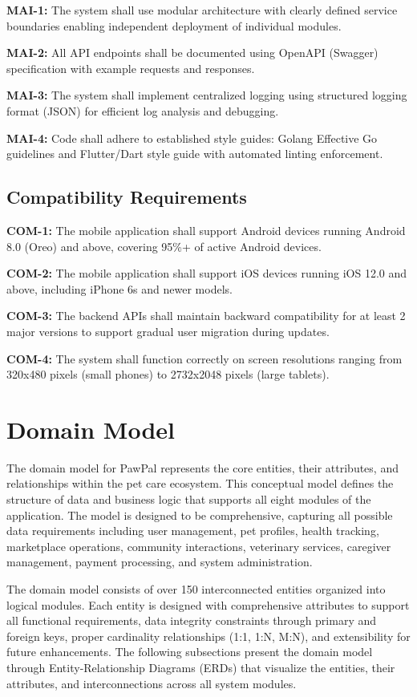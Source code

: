 \textbf{MAI-1:} The system shall use modular architecture with clearly defined service boundaries enabling independent deployment of individual modules.

\textbf{MAI-2:} All API endpoints shall be documented using OpenAPI (Swagger) specification with example requests and responses.

\textbf{MAI-3:} The system shall implement centralized logging using structured logging format (JSON) for efficient log analysis and debugging.

\textbf{MAI-4:} Code shall adhere to established style guides: Golang Effective Go guidelines and Flutter/Dart style guide with automated linting enforcement.

\subsection{Compatibility Requirements}

\textbf{COM-1:} The mobile application shall support Android devices running Android 8.0 (Oreo) and above, covering 95\%+ of active Android devices.

\textbf{COM-2:} The mobile application shall support iOS devices running iOS 12.0 and above, including iPhone 6s and newer models.

\textbf{COM-3:} The backend APIs shall maintain backward compatibility for at least 2 major versions to support gradual user migration during updates.

\textbf{COM-4:} The system shall function correctly on screen resolutions ranging from 320x480 pixels (small phones) to 2732x2048 pixels (large tablets).


\section{Domain Model}
The domain model for PawPal represents the core entities, their attributes, and relationships within the pet care ecosystem. This conceptual model defines the structure of data and business logic that supports all eight modules of the application. The model is designed to be comprehensive, capturing all possible data requirements including user management, pet profiles, health tracking, marketplace operations, community interactions, veterinary services, caregiver management, payment processing, and system administration.

The domain model consists of over 150 interconnected entities organized into logical modules. Each entity is designed with comprehensive attributes to support all functional requirements, data integrity constraints through primary and foreign keys, proper cardinality relationships (1:1, 1:N, M:N), and extensibility for future enhancements. The following subsections present the domain model through Entity-Relationship Diagrams (ERDs) that visualize the entities, their attributes, and interconnections across all system modules.

